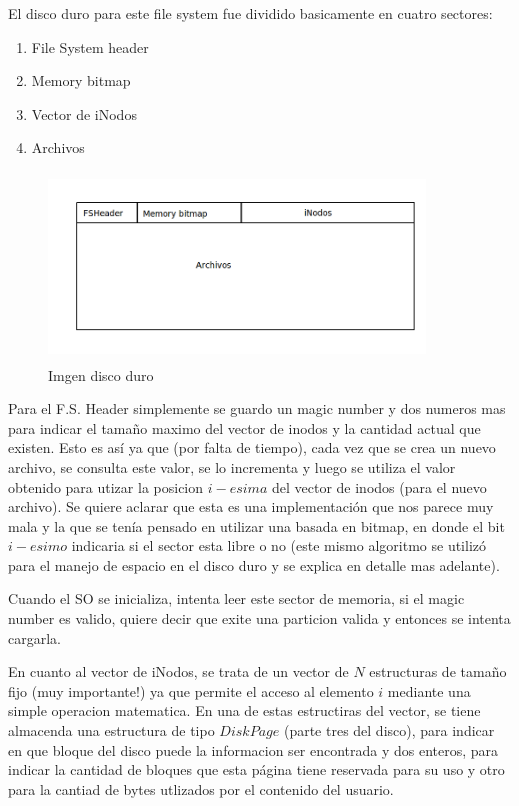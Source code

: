 \documentclass[english]{article}
\begin{document}
El disco duro para este file system fue dividido basicamente en cuatro
sectores:
\begin{enumerate}
\item File System header
\item Memory bitmap
\item Vector de iNodos
\item Archivos
\end{enumerate}
\begin{figure}[H]
\includegraphics[width=10cm,height=5cm,keepaspectratio]{Imagen_disco}

\caption{Imgen disco duro}
\end{figure}


Para el F.S. Header simplemente se guardo un magic number y dos numeros
mas para indicar el tamaño maximo del vector de inodos y la cantidad
actual que existen. Esto es así ya que (por falta de tiempo), cada
vez que se crea un nuevo archivo, se consulta este valor, se lo incrementa
y luego se utiliza el valor obtenido para utizar la posicion $i-esima$
del vector de inodos (para el nuevo archivo). Se quiere aclarar que
esta es una implementación que nos parece muy mala y la que se tenía
pensado en utilizar una basada en bitmap, en donde el bit $i-esimo$
indicaria si el sector esta libre o no (este mismo algoritmo se utilizó
para el manejo de espacio en el disco duro y se explica en detalle
mas adelante). 

Cuando el SO se inicializa, intenta leer este sector de memoria, si
el magic number es valido, quiere decir que exite una particion valida
y entonces se intenta cargarla.

En cuanto al vector de iNodos, se trata de un vector de $N$ estructuras
de tamaño fijo (muy importante!) ya que permite el acceso al elemento
$i$ mediante una simple operacion matematica. En una de estas estructiras
del vector, se tiene almacenda una estructura de tipo $DiskPage$
(parte tres del disco), para indicar en que bloque del disco puede
la informacion ser encontrada y dos enteros, para indicar la cantidad
de bloques que esta página tiene reservada para su uso y otro para
la cantiad de bytes utlizados por el contenido del usuario.
\end{document}
